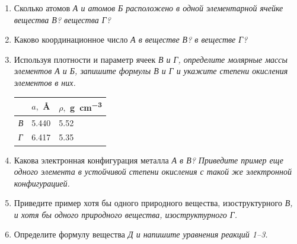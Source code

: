 \begin{enumerate}
  \item Сколько атомов \em{А} и атомов \em{Б} расположено в одной элементарной ячейке вещества \em{В}? вещества \em{Г}?
  \item Каково координационное число \em{А} в веществе \em{В}? в веществе \em{Г}?
  \item Используя плотности и параметр ячеек \em{В} и \em{Г}, определите молярные массы элементов \em{А} и \em{Б}, запишите формулы \em{В} и \em{Г} и укажите степени окисления элементов в них.

  \begin{table}[H]
    \centering
    \begin{tabularx}{0.7\textwidth}{|Y|Y|Y|}
      \hline
       & $a,$ \unit{\angstrom} & $\rho,$ \unit{\gram\per\centi\meter\cubed} \\
      \hline
      \em{В} & 5.440 & 5.52 \\
      \hline
      \em{Г} & 6.417 & 5.35 \\
      \hline
    \end{tabularx}
  \end{table}

  \item Какова электронная конфигурация металла \em{А} в \em{В}? Приведите пример еще одного элемента в устойчивой степени окисления с такой же электронной конфигурацией.

  \item Приведите пример хотя бы одного природного вещества, изоструктурного \em{В}, и хотя бы одного природного вещества, изоструктурного \em{Г}.

  \item Определите формулу вещества \em{Д} и напишите уравнения \em{реакций 1--3}.
\end{enumerate}

